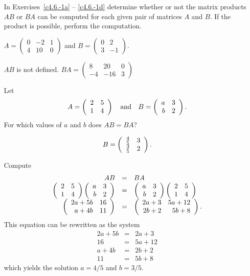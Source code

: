 \documentclass{article}
\begin{document}




\problemlabel

\noindent In Exercises~\ref{c4.6.-1a} -- \ref{c4.6.-1d} determine whether or 
not the matrix products $AB$ or $BA$ can be computed for each given pair of 
matrices $A$ and $B$.  If the product is possible, perform the computation.


\begin{exercise}  \label{c4.6.-1b}
$A=\left(\begin{array}{rrr} 0 & -2 & 1\\ 4 & 10 & 0 \end{array}\right)$
and $B=\left(\begin{array}{rr} 0 & 2 \\ 3 & -1 \end{array}\right)$.

\begin{solution}
\ans $AB$ is not defined. $BA=\left(\begin{array}{rrr} 8 &  20 &  0\\
 -4 & -16  &  3\end{array}\right)$
\end{solution}
\end{exercise}





\problemlabel

\begin{exercise} \label{c4.6.2}
Let
\[
A=\left(\begin{array}{rr} 2 & 5\\ 1 &4\end{array}\right) \quad\mbox{and}\quad B=\left(\begin{array}{rr} a & 3\\ b &2\end{array}\right).
\]
For which values of $a$ and $b$ does $AB=BA$?

\begin{solution}

\ans 
\[
B = \left(\begin{array}{rr} \frac{4}{5} & 3\\ \frac{3}{5} &2\end{array}\right).
\]

\soln Compute
\[
\begin{array}{rcl}
AB & = & BA \\
\left(\begin{array}{rr} 2 & 5\\ 1 &4\end{array}\right)\left(\begin{array}{rr} a & 3\\ b &2\end{array}\right) & = &
\left(\begin{array}{rr} a & 3\\ b &2\end{array}\right)\left(\begin{array}{rr} 2 & 5\\ 1 &4\end{array}\right) \\
\left(\begin{array}{rr} 2a+5b & 16\\ a+4b &11\end{array}\right) & = & \left(\begin{array}{rr} 2a+3 & 5a+12\\ 2b+2 &5b+8\end{array}\right).
\end{array}
\]
This equation can be rewritten as the system
\[
\begin{array}{rcl}
2a + 5b & = & 2a + 3 \\
16 & = & 5a + 12 \\
a + 4b & = & 2b + 2 \\
11 & = & 5b + 8 \end{array}
\]
which yields the solution $a = 4/5$ and $b = 3/5$.

\end{solution}
\end{exercise}


\end{document}
